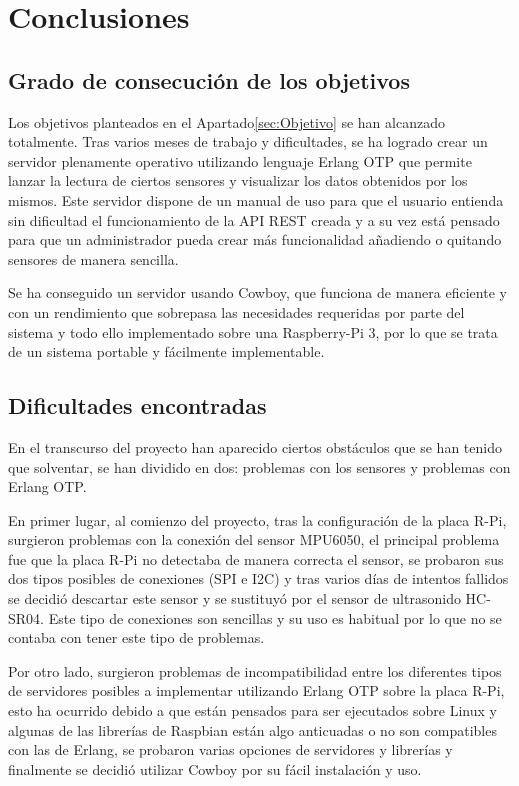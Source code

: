 \chapter{Conclusiones}

\section{Grado de consecución de los objetivos}

Los objetivos planteados en el Apartado\ref{sec:Objetivo} se han alcanzado totalmente. Tras varios meses de trabajo y dificultades, se ha logrado crear un servidor plenamente operativo utilizando lenguaje Erlang OTP que permite lanzar la lectura de ciertos sensores y visualizar los datos obtenidos por los mismos. Este servidor dispone de un manual de uso para que el usuario entienda sin dificultad el funcionamiento de la API REST creada y a su vez está pensado para que un administrador pueda crear más funcionalidad añadiendo o quitando sensores de manera sencilla.

Se ha conseguido un servidor usando Cowboy, que funciona de manera eficiente y con un rendimiento que sobrepasa las necesidades requeridas por parte del sistema y todo ello implementado sobre una Raspberry-Pi 3, por lo que se trata de un sistema portable y fácilmente implementable.

\section{Dificultades encontradas}

En el transcurso del proyecto han aparecido ciertos obstáculos que se han tenido que solventar, se han dividido en dos: problemas con los sensores y problemas con Erlang OTP.

En primer lugar, al comienzo del proyecto, tras la configuración de la placa R-Pi, surgieron problemas con la conexión del sensor MPU6050, el principal problema fue que la placa R-Pi no detectaba de manera correcta el sensor, se probaron sus dos tipos posibles de conexiones (SPI e I2C) y tras varios días de intentos fallidos se decidió descartar este sensor y se sustituyó por el sensor de ultrasonido HC-SR04. Este tipo de conexiones son sencillas y su uso es habitual por lo que no se contaba con tener este tipo de problemas.

Por otro lado, surgieron problemas de incompatibilidad entre los diferentes tipos de servidores posibles a implementar utilizando Erlang OTP sobre la placa R-Pi, esto ha ocurrido debido a que están pensados para ser ejecutados sobre Linux y algunas de las librerías de Raspbian están algo anticuadas o no son compatibles con las de Erlang, se probaron varias opciones de servidores y librerías y finalmente se decidió utilizar Cowboy por su fácil instalación y uso.

